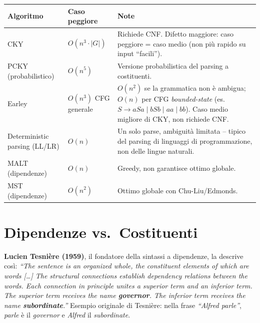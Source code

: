 \documentclass[12pt,a4paper]{article}
\begin{document}
\begin{center}
\begin{tabular}{lll}
\toprule
\textbf{Algoritmo} & \textbf{Caso peggiore} & \textbf{Note} \\
\midrule
CKY & $O(n^3 \cdot |G|)$ & Richiede CNF. Difetto maggiore: caso peggiore = caso medio (non più rapido su input ``facili''). \\
PCKY (probabilistico) & $O(n^5)$ & Versione probabilistica del parsing a costituenti. \\
Earley & $O(n^3)$ CFG generale & $O(n^2)$ se la grammatica non è ambigua; $O(n)$ per CFG \emph{bounded-state} (es.\ $S\to aSa\mid bSb\mid aa\mid bb$). Caso medio migliore di CKY, non richiede CNF. \\
Deterministic parsing (LL/LR) & $O(n)$ & Un solo parse, ambiguità limitata -- tipico del parsing di linguaggi di programmazione, non delle lingue naturali. \\
MALT (dipendenze) & $O(n)$ & Greedy, non garantisce ottimo globale. \\
MST (dipendenze) & $O(n^2)$ & Ottimo globale con Chu-Liu/Edmonds. \\
\bottomrule
\end{tabular}
\end{center}

\section{Dipendenze vs.\ Costituenti}

\begin{defbox}
\textbf{Lucien Tesnière (1959)}, il fondatore della sintassi a dipendenze, la descrive così: \textit{``The sentence is an organized whole, the constituent elements of which are words [\ldots] The structural connections establish dependency relations between the words. Each connection in principle unites a superior term and an inferior term. The superior term receives the name \textbf{governor}. The inferior term receives the name \textbf{subordinate}.''} Esempio originale di Tesnière: nella frase \textit{``Alfred parle''}, \textit{parle} è il \emph{governor} e \textit{Alfred} il \emph{subordinate}.
\end{defbox}
\end{document}
